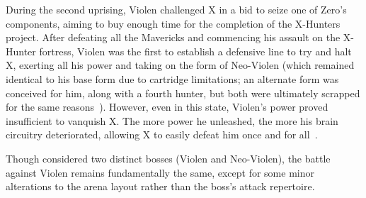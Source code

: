 During the second uprising, Violen challenged X in a bid to seize one of Zero's components, aiming to buy enough time for the completion of the X-Hunters project. After defeating all the Mavericks and commencing his assault on the X-Hunter fortress, Violen was the first to establish a defensive line to try and halt X, exerting all his power and taking on the form of Neo-Violen (which remained identical to his base form due to cartridge limitations; an alternate form was conceived for him, along with a fourth hunter, but both were ultimately scrapped for the same reasons~\cite{book:MMX_Complete_art}). However, even in this state, Violen's power proved insufficient to vanquish X. The more power he unleashed, the more his brain circuitry deteriorated, allowing X to easily defeat him once and for all~\cite{wayback:X2_resources}.

Though considered two distinct bosses (Violen and Neo-Violen), the battle against Violen remains fundamentally the same, except for some minor alterations to the arena layout rather than the boss's attack repertoire.


